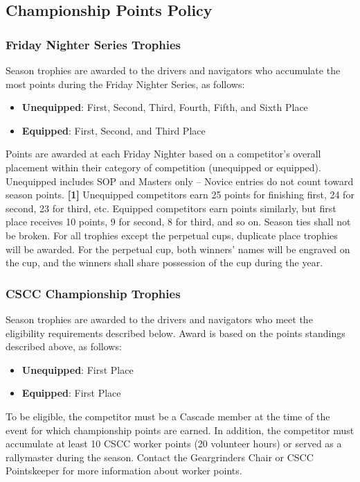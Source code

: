 \subsection{Championship Points Policy}
\subsubsection{Friday Nighter Series Trophies}
Season trophies are awarded to the drivers and navigators who accumulate the most points during the Friday Nighter Series, as follows:
\begin{itemize}
\item \textbf{Unequipped}: First, Second, Third, Fourth, Fifth, and Sixth Place
\item \textbf{Equipped}: First, Second, and Third Place
\end{itemize}

Points are awarded at each Friday Nighter based on a competitor’s overall placement within their category of competition (unequipped or equipped). Unequipped includes SOP and Masters only – Novice entries do not count toward season points. \textbf{[1]} Unequipped competitors earn 25 points for finishing first, 24 for second, 23 for third, etc. Equipped competitors earn points similarly, but first place receives 10 points, 9 for second, 8 for third, and so on. Season ties shall not be broken. For all trophies except the perpetual cups, duplicate place trophies will be awarded. For the perpetual cup, both winners' names will be engraved on the cup, and the winners shall share possession of the cup during the year.

\subsubsection{CSCC Championship Trophies}
Season trophies are awarded to the drivers and navigators who meet the eligibility requirements described below. Award is based on the points standings described above, as follows:
\begin{itemize}
\item \textbf{Unequipped}: First Place
\item \textbf{Equipped}: First Place
\end{itemize}

To be eligible, the competitor must be a Cascade member at the time of the event for which championship points are earned. In addition, the competitor must accumulate at least 10 CSCC worker points (20 volunteer hours) or served as a rallymaster during the season. Contact the Geargrinders Chair or CSCC Pointskeeper for more information about worker points.

